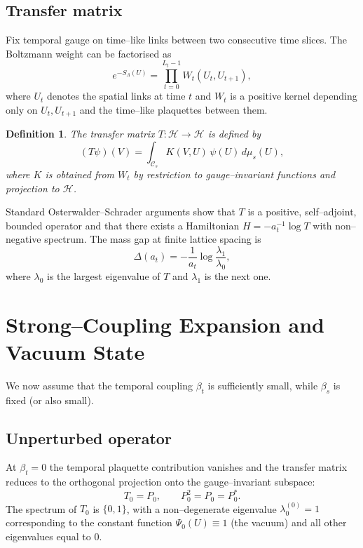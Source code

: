 \documentclass[11pt]{article}
\newtheorem{definition}[theorem]{Definition}
\begin{document}
\subsection{Transfer matrix}

Fix temporal gauge on time--like links between two consecutive time
slices. The Boltzmann weight can be factorised as
\begin{equation}
  e^{-S_\Lambda(U)} = \prod_{t=0}^{L_t-1} W_t(U_t,U_{t+1}),
\end{equation}
where $U_t$ denotes the spatial links at time $t$ and $W_t$ is a positive
kernel depending only on $U_t,U_{t+1}$ and the time--like plaquettes
between them.

\begin{definition}
The transfer matrix $T:\mathcal{H}\to\mathcal{H}$ is defined by
\begin{equation}
  (T\psi)(V) = \int_{\mathcal{C}_s} K(V,U)\,\psi(U)\,d\mu_s(U),
\end{equation}
where $K$ is obtained from $W_t$ by restriction to gauge--invariant
functions and projection to $\mathcal{H}$.
\end{definition}

Standard Osterwalder--Schrader arguments show that $T$ is a positive,
self--adjoint, bounded operator and that there exists a Hamiltonian
$H = -a_t^{-1}\log T$ with non--negative spectrum. The mass gap at
finite lattice spacing is
\begin{equation}
  \Delta(a_t) = -\frac{1}{a_t}\log\frac{\lambda_1}{\lambda_0},
\end{equation}
where $\lambda_0$ is the largest eigenvalue of $T$ and $\lambda_1$ is the
next one.

\section{Strong--Coupling Expansion and Vacuum State}

We now assume that the temporal coupling $\beta_t$ is sufficiently small,
while $\beta_s$ is fixed (or also small).

\subsection{Unperturbed operator}

At $\beta_t=0$ the temporal plaquette contribution vanishes and the
transfer matrix reduces to the orthogonal projection onto the
gauge--invariant subspace:
\begin{equation}
  T_0 = P_0,\qquad P_0^2 = P_0 = P_0^*.
\end{equation}
The spectrum of $T_0$ is $\{0,1\}$, with a non--degenerate eigenvalue
$\lambda_0^{(0)} = 1$ corresponding to the constant function
$\Psi_0(U)\equiv 1$ (the vacuum) and all other eigenvalues equal to $0$.
\end{document}
